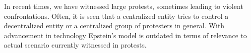 \documentclass[a4paper,11pt]{article}
\begin{document}
In recent times, we have witnessed large protests, sometimes leading to violent confrontations. Often, it is seen that a centralized entity tries to control a decentralized entity or a centralized group of protesters in general. With advancement in technology Epstein's model is outdated in terms of relevance to actual scenario currently witnessed in protests. %
\end{document}
